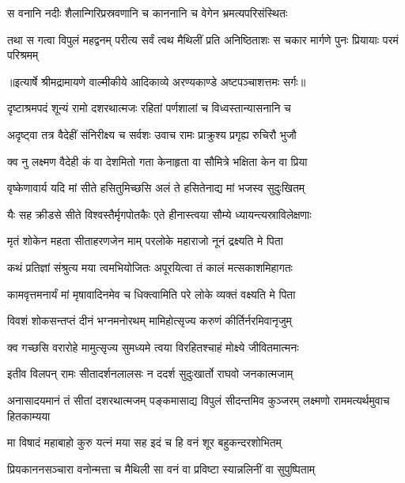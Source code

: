 \twolineshloka
{स वनानि नदीः शैलान्गिरिप्रस्रवणानि च}
{काननानि च वेगेन भ्रमत्यपरिसंस्थितः} %

\fourlineindentedshloka
{तथा स गत्वा विपुलं महद्वनम्}
{परीत्य सर्वं त्वथ मैथिलीं प्रति}
{अनिष्ठिताशः स चकार मार्गणे}
{पुनः प्रियायाः परमं परिश्रमम्} %


{॥इत्यार्षे श्रीमद्रामायणे वाल्मीकीये आदिकाव्ये अरण्यकाण्डे अष्टपञ्चाशत्तमः सर्गः॥}


\twolineshloka
{दृष्टाश्रमपदं शून्यं रामो दशरथात्मजः}
{रहितां पर्णशालां च विध्वस्तान्यासनानि च} %

\twolineshloka
{अदृष्ट्वा तत्र वैदेहीं संनिरीक्ष्य च सर्वशः}
{उवाच रामः प्राक्रुश्य प्रगृह्य रुचिरौ भुजौ} %

\twolineshloka
{क्व नु लक्ष्मण वैदेही कं वा देशमितो गता}
{केनाहृता वा सौमित्रे भक्षिता केन वा प्रिया} %

\twolineshloka
{वृष्केणावार्य यदि मां सीते हसितुमिच्छसि}
{अलं ते हसितेनाद्य मां भजस्व सुदुःखितम्} %

\twolineshloka
{यैः सह क्रीडसे सीते विश्वस्तैर्मृगपोतकैः}
{एते हीनास्त्वया सौम्ये ध्यायन्त्यस्राविलेक्षणाः} %

\twolineshloka
{मृतं शोकेन महता सीताहरणजेन माम्}
{परलोके महाराजो नूनं द्रक्ष्यति मे पिता} %

\twolineshloka
{कथं प्रतिज्ञां संश्रुत्य मया त्वमभियोजितः}
{अपूरयित्वा तं कालं मत्सकाशमिहागतः} %

\twolineshloka
{कामवृत्तमनार्यं मां मृषावादिनमेव च}
{धिक्त्वामिति परे लोके व्यक्तं वक्ष्यति मे पिता} %

\twolineshloka
{विवशं शोकसन्तप्तं दीनं भग्नमनोरथम्}
{मामिहोत्सृज्य करुणं कीर्तिर्नरमिवानृजुम्} %

\twolineshloka
{क्व गच्छसि वरारोहे मामुत्सृज्य सुमध्यमे}
{त्वया विरहितश्चाहं मोक्ष्ये जीवितमात्मनः} %

\twolineshloka
{इतीव विलपन् रामः सीतादर्शनलालसः}
{न ददर्श सुदुःखार्तो राघवो जनकात्मजाम्} %

\threelineshloka
{अनासादयमानं तं सीतां दशरथात्मजम्}
{पङ्कमासाद्य विपुलं सीदन्तमिव कुञ्जरम्}
{लक्ष्मणो राममत्यर्थमुवाच हितकाम्यया} %

\twolineshloka
{मा विषादं महाबाहो कुरु यत्नं मया सह}
{इदं च हि वनं शूर बहुकन्दरशोभितम्} %

\twolineshloka
{प्रियकाननसञ्चारा वनोन्मत्ता च मैथिली}
{सा वनं वा प्रविष्टा स्यान्नलिनीं वा सुपुष्पिताम्} %

